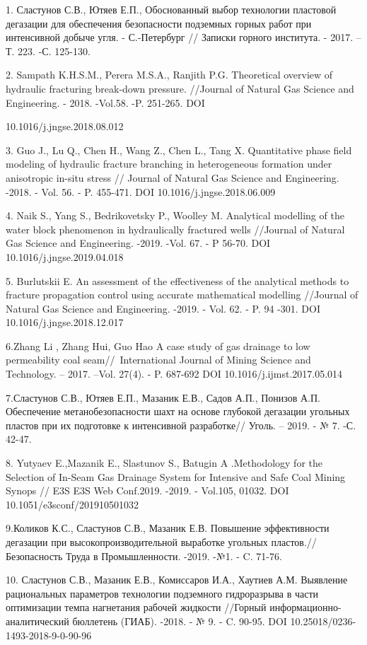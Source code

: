 \begin{noparindent}
1. Сластунов С.В., Ютяев Е.П., Обоснованный выбор технологии пластовой
дегазации для обеспечения безопасности подземных горных работ при
интенсивной добыче угля. - С.-Петербург // Записки горного института. -
2017. --Т. 223. -С. 125-130.

2. Sampath K.H.S.M., Perera M.S.A., Ranjith P.G. Theoretical overview of
hydraulic fracturing break-down pressure. //Journal of Natural Gas
Science and Engineering. - 2018. -Vol.58. -P. 251-265. DOI

10.1016/j.jngse.2018.08.012

3. Guo J., Lu Q., Chen H., Wang Z., Chen L., Tang X. Quantitative phase
field modeling of hydraulic fracture branching in heterogeneous
formation under anisotropic in-situ stress // Journal of Natural Gas
Science and Engineering. -2018. - Vol. 56. - P. 455-471. DOI
10.1016/j.jngse.2018.06.009

4. Naik S., Yang S., Bedrikovetsky P., Woolley M. Analytical modelling
of the water block phenomenon in hydraulically fractured wells //Journal
of Natural Gas Science and Engineering. -2019. -Vol. 67. - P 56-70. DOI
10.1016/j.jngse.2019.04.018

5. Burlutskii E. An assessment of the effectiveness of the analytical
methods to fracture propagation control using accurate mathematical
modelling //Journal of Natural Gas Science and Engineering. -2019. -
Vol. 62. - P. 94 -301. DOI 10.1016/j.jngse.2018.12.017

6.Zhang Li , Zhang Hui, Guo Hao A case study of gas drainage to low
permeability coal seam//~International Journal of Mining Science and
Technology. -- 2017. --Vol. 27(4). - P. 687-692 DOI
10.1016/j.ijmst.2017.05.014

7.Сластунов С.В., Ютяев Е.П., Мазаник Е.В., Садов А.П., Понизов А.П.
Обеспечение метанобезопасности шахт на основе глубокой дегазации
угольных пластов при их подготовке к интенсивной разработке// Уголь. --
2019. - № 7. -С. 42-47.

8. Yutyaev E.,Mazanik E., Slastunov S., Batugin A .Methodology for the
Selection of In-Seam Gas Drainage System for Intensive and Safe Coal
Mining Synops // E3S E3S Web Conf.2019. -2019. - Vol.105, 01032. DOI
10.1051/e3sconf/201910501032

9.Коликов К.С., Сластунов С.В., Мазаник Е.В. Повышение эффективности
дегазации при высокопроизводительной выработке угольных пластов.//
Безопасность Труда в Промышленности. -2019. -№1. - C. 71-76.

10. Сластунов С.В., Мазаник Е.В., Комиссаров И.А., Хаутиев А.М.
Выявление рациональных параметров технологии подземного гидроразрыва в
части оптимизации темпа нагнетания рабочей жидкости //Горный
информационно-аналитический бюллетень (ГИАБ). -2018. - № 9. - C. 90-95.
DOI 10.25018/0236-1493-2018-9-0-90-96
\end{noparindent}

